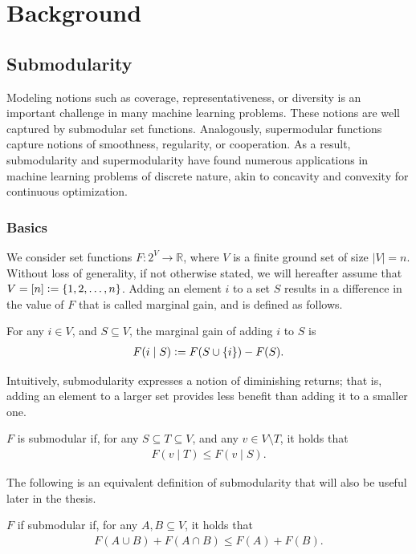 \chapter{Background} \label{ch:background}

\section{Submodularity} \label{sect:bg_submod}

Modeling notions such as coverage, representativeness, or diversity is an important challenge in many machine learning problems.
These notions are well captured by submodular set functions.
Analogously, supermodular functions capture notions of smoothness, regularity, or cooperation. 
As a result, submodularity and supermodularity have found numerous applications in machine learning problems of discrete nature, akin to concavity and convexity for continuous optimization.

\subsection{Basics}
We consider set functions $F : 2^V \to \mathbb{R}$, where $V$ is a finite ground set of size $|V| = n$.
Without loss of generality, if not otherwise stated, we will hereafter assume that $V = [n] \vcentcolon= \{1, 2, \ldots,n\}$.
Adding an element $i$ to a set $S$ results in a difference in the value of $F$ that is called marginal gain, and is defined as follows.
\begin{definition}
For any $i \in V$, and $S \subseteq V$, the marginal gain of adding $i$ to $S$ is
\begin{align*}
F(i \mid S) \vcentcolon= F(S \cup \{i\}) - F(S).
\end{align*}
\end{definition}

Intuitively, submodularity expresses a notion of diminishing returns; that is, adding an element to a larger set provides less benefit than adding it to a smaller one.
\begin{definition}[Submodularity]
$F$ is submodular if, for any $S \subseteq T \subseteq V$, and any $v \in V \setminus T$, it holds that
\begin{align*}
F(v\mid T) \leq F(v\mid S).
\end{align*}
\end{definition}
\noindent The following is an equivalent definition of submodularity that will also be useful later in the thesis.
\begin{definition}[Submodularity] \label{def:submod}
$F$ if submodular if, for any $A, B \subseteq V$, it holds that
\begin{align*}
F(A \cup B) + F(A \cap B) \leq F(A) + F(B).
\end{align*}
\end{definition}

